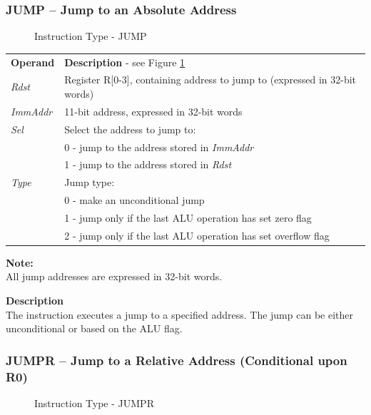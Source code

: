 \documentclass[main\_\_EN.tex]{subfiles}
\begin{document}
\subsubsection{JUMP – Jump to an Absolute Address} \label{paragraph:JUMP}

%
%
%
%
%
%
%
%
\begin{figure}[!ht ]
    \centering
    \caption{Instruction Type - JUMP}
    \label{figure:JUMP}
\end{figure}

\begin{tabular}{ l l }
\textbf{Operand} & \textbf{Description} - see Figure  \ref{figure:JUMP} \\
\textit{Rdst} & Register R[0-3], containing address to jump to (expressed in 32-bit words)\\
\textit{ImmAddr} & 11-bit address, expressed in 32-bit words\\
\textit{Sel} & Select the address to jump to: \\
 & 0 - jump to the address stored in \textit{ ImmAddr}\\
 & 1 - jump to the address stored in \textit{Rdst} \\
\textit{Type} & Jump type: \\
 & 0 - make an unconditional jump \\
 & 1 - jump only if the last ALU operation has set zero flag \\
 & 2 - jump only if the last ALU operation has set overflow flag
\end{tabular}

\textbf{Note:} \\
All jump addresses are expressed in 32-bit words.

\textbf{Description} \\
The instruction executes a jump to a specified address. The jump can be either unconditional or based on the ALU flag.

\subsubsection{JUMPR – Jump to a Relative Address (Conditional upon R0)}


%
%
%
%
%
\begin{figure}[!ht ]
    \centering
    \caption{Instruction Type - JUMPR}
    \label{figure:JUMPR}
\end{figure}
\end{document}
